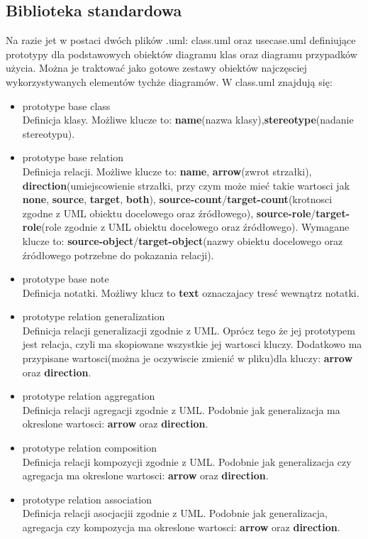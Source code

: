 \subsection{Biblioteka standardowa}

Na razie jet w postaci dwóch plików .uml: class.uml oraz usecase.uml definiujące prototypy dla podstawowych obiektów diagramu klas oraz diagramu przypadków użycia. Można je traktować jako gotowe zestawy obiektów najczęsciej wykorzystywanych elementów tychże diagramów.
W class.uml znajdują się:
\begin{itemize}
\item prototype base class \\
Definicja klasy. Możliwe klucze to: \textbf{name}(nazwa klasy),\textbf{stereotype}(nadanie stereotypu). 
\item prototype base relation \\
Definicja relacji. Możliwe klucze to: \textbf{name}, \textbf{arrow}(zwrot strzałki), \textbf{direction}(umiejscowienie strzałki, przy czym może mieć takie wartosci jak \textbf{none}, \textbf{source}, \textbf{target}, \textbf{both}), \textbf{source-count}/\textbf{target-count}(krotnosci zgodne z UML obiektu docelowego oraz źródłowego), \textbf{source-role}/\textbf{target-role}(role zgodnie z UML obiektu docelowego oraz źródłowego). Wymagane klucze to: \textbf{source-object}/\textbf{target-object}(nazwy obiektu docelowego oraz źródłowego potrzebne do pokazania relacji).
\item prototype base note \\
Definicja notatki. Możliwy klucz to \textbf{text} oznaczajacy tresć wewnątrz notatki. 
\item prototype relation generalization \\
Definicja relacji generalizacji zgodnie z UML. Oprócz tego że jej prototypem jest relacja, czyli ma skopiowane wszystkie jej wartosci kluczy. Dodatkowo ma przypisane wartosci(można je oczywiscie zmienić w pliku)dla kluczy: \textbf{arrow} oraz \textbf{direction}.
\item prototype relation aggregation \\
Definicja relacji agregacji zgodnie z UML. Podobnie jak generalizacja ma okreslone wartosci: \textbf{arrow} oraz \textbf{direction}.
\item prototype relation composition \\
Definicja relacji kompozycji zgodnie z UML. Podobnie jak generalizacja czy agregacja ma okreslone wartosci: \textbf{arrow} oraz \textbf{direction}.
\item prototype relation association \\
Definicja relacji asocjacjii zgodnie z UML. Podobnie jak generalizacja, agregacja czy kompozycja ma okreslone wartosci: \textbf{arrow} oraz \textbf{direction}.

\end{itemize}

